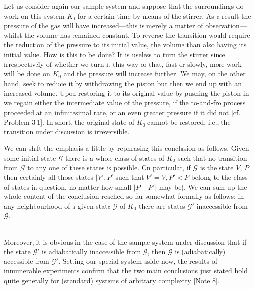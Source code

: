\documentclass{article}
\theoremstyle{definition}
\begin{document}
Let us consider again our sample system and suppose that the surroundings do work on this system \(K_0\) for a certain time by means of the stirrer. As a result the pressure of the gas will have increased—this is merely a matter of observation—whilst the volume has remained constant. To reverse the transition would require the reduction of the pressure to its initial value, the volume than also having its initial value. How is this to be done? It is useless to turn the stirrer since irrespectively of whether we turn it this way or that, fast or slowly, more work will be done on \(K_0\) and the pressure will increase further. We may, on the other hand, seek to reduce it by withdrawing the piston but then we end up with an increased volume. Upon restoring it to its original value by pushing the piston in we regain either the intermediate value of the pressure, if the to-and-fro process proceeded at an infinitesimal rate, or an even greater pressure if it did not [cf. Problem 3.1]. In short, the original state of \(K_0\) cannot be restored, i.e., the transition under discussion is irreversible.

We can shift the emphasis a little by rephrasing this conclusion as follows. Given some initial state \(\mathcal{G}\) there is a whole class of states of \(K_0\) such that no transition from \(\mathcal{G}\) to any one of these states is possible. On particular, if \(\mathcal{G}\) is the state \(V\), \(P\) then certainly all those states \(|V', P'\) such that \(V'=V,P'<P\) belong to the class of states in question, no matter how small \(|P-P'|\) may be). We can sum up the whole content of the conclusion reached so far somewhat formally as follows: in any neighbourhood of a given state \(\mathcal{G}\) of \(K_0\) there are states \(\mathcal{G}'\) inaccessible from \(\mathcal{G}\).

\\
\normalfont
Moreover, it is obvious in the case of the sample system under discussion that if the state \(\mathcal{G}'\) is adiabatically inaccessible from \(\mathcal{G}\), then \(\mathcal{G}\) is (adiabatically) accessible from \(\mathcal{G}'\). Setting our special system aside now, the results of innumerable experiments confirm that the two main conclusions just stated hold quite generally for (standard) systems of arbitrary complexity [Note 8].
\end{document}
